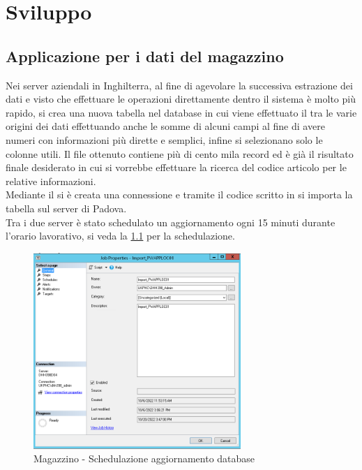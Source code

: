 \chapter{Sviluppo}
\section{Applicazione per i dati del magazzino}
Nei server aziendali in Inghilterra, al fine di agevolare la successiva estrazione dei dati e visto che effettuare le operazioni direttamente dentro il sistema  è molto più rapido, si crea una nuova tabella nel database  in cui viene effettuato il  tra le varie origini dei dati effettuando anche le somme di alcuni campi al fine di avere numeri con informazioni più dirette e semplici, infine si selezionano solo le colonne utili.
Il file ottenuto contiene più di cento mila record ed è già il risultato finale desiderato in cui si vorrebbe effettuare la ricerca del codice articolo per le relative informazioni.\\ 
Mediante il  si è creata una connessione  e tramite il codice scritto in  si importa la tabella sul server di Padova.\\
Tra i due server è stato schedulato un aggiornamento ogni 15 minuti durante l’orario lavorativo, si veda la \figurename \space \ref*{fig:M-Schedulazione} per la schedulazione.
\begin{figure}[H]
    \centering\includegraphics[width=0.7\textwidth, height=0.7\textheight,keepaspectratio]{immagini/M-schedulazione.png}
    \caption{Magazzino - Schedulazione aggiornamento database}
    \label{fig:M-Schedulazione}
\end{figure}
